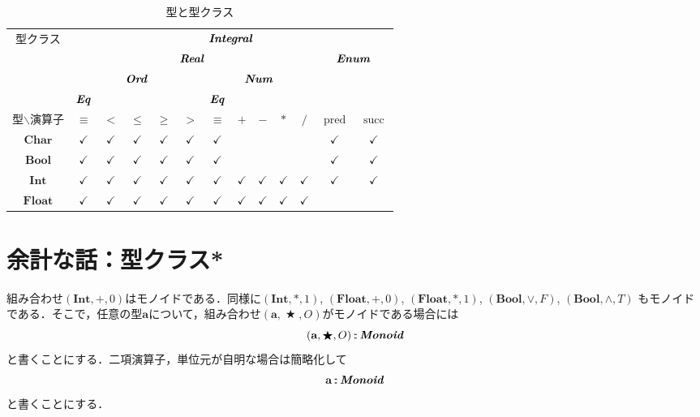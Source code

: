 \documentclass[twocolumn]{jsbook}
\newcommand{\hsklType}[1]{\textbf{#1}}
\newcommand{\hsklTypeClass}[1]{\textbf{\emph{#1}}}
\DeclareMathOperator{\hsklPred}{pred}
\DeclareMathOperator{\hsklSucc}{succ}
\newcommand{\hsklBool}{\hsklType{Bool}}
\newcommand{\hsklChar}{\hsklType{Char}}
\newcommand{\hsklEnum}{\hsklTypeClass{Enum}}
\newcommand{\hsklInt}{\hsklType{Int}}
\newcommand{\hsklIntegral}{\hsklTypeClass{Integral}}
\newcommand{\hsklEq}{\hsklTypeClass{Eq}}
\newcommand{\hsklFloat}{\hsklType{Float}}
\newcommand{\hsklMonoid}{\hsklTypeClass{Monoid}}
\newcommand{\hsklNum}{\hsklTypeClass{Num}}
\newcommand{\hsklOrd}{\hsklTypeClass{Ord}}
\newcommand{\hsklReal}{\hsklTypeClass{Real}}
\DeclareMathOperator{\mathAnyBinaryOperator}{\bigstar}
\DeclareMathOperator{\mathIn}{:\!:}
\newcommand{\mathMonoid}[3]{(#1,#2,#3)}
\begin{document}
\begin{table*}
\caption{型と型クラス}
\label{tab:type-and-typeclass}
\begin{center}
\begin{tabular}{||c||c|c|c|c|c|c|c|c|c|c|c|c||}
\hline
\multirow{4}{*}{型クラス}
    &\multicolumn{12}{|c||}{$\hsklIntegral$}\\
\cline{2-13}
\multirow{3}{*}{}
    &\multicolumn{10}{|c|}{$\hsklReal$}
    &\multicolumn{2}{|c||}{$\hsklEnum$}\\
\cline{2-11}
\multirow{2}{*}{}
    &\multicolumn{5}{|c|}{$\hsklOrd$}
    &\multicolumn{5}{|c|}{$\hsklNum$}
    &\multicolumn{2}{|c||}{ }\\
\cline{2-2}\cline{7-7}
{ }
    &$\hsklEq$
    &\multicolumn{4}{|c|}{ }
    &$\hsklEq$
    &\multicolumn{4}{|c|}{ }
    &\multicolumn{2}{|c||}{ }\\
\hline\hline
型$\backslash$演算子
    &$\equiv$
    &$<$
    &$\le$
    &$\ge$
    &$>$
    &$\equiv$
    &$+$
    &$-$
    &$*$
    &$/$
    &$\hsklPred$
    &$\hsklSucc$\\
\hline
$\hsklChar$
    &$\checkmark$
    &$\checkmark$
    &$\checkmark$
    &$\checkmark$
    &$\checkmark$
    &$\checkmark$
    &
    &
    &
    &
    &$\checkmark$
    &$\checkmark$\\
\hline
$\hsklBool$
    &$\checkmark$
    &$\checkmark$
    &$\checkmark$
    &$\checkmark$
    &$\checkmark$
    &$\checkmark$
    &
    &
    &
    &
    &$\checkmark$
    &$\checkmark$\\
\hline
$\hsklInt$
    &$\checkmark$
    &$\checkmark$
    &$\checkmark$
    &$\checkmark$
    &$\checkmark$
    &$\checkmark$
    &$\checkmark$
    &$\checkmark$
    &$\checkmark$
    &$\checkmark$
    &$\checkmark$
    &$\checkmark$\\
\hline
$\hsklFloat$
    &$\checkmark$
    &$\checkmark$
    &$\checkmark$
    &$\checkmark$
    &$\checkmark$
    &$\checkmark$
    &$\checkmark$
    &$\checkmark$
    &$\checkmark$
    &$\checkmark$
    &
    &\\
\hline
\end{tabular}
\end{center}
\end{table*}

\section{余計な話：型クラス*}

組み合わせ$\mathMonoid{\hsklInt}{+}{0}$はモノイドである．同様に$\mathMonoid{\hsklInt}{*}{1}$, $\mathMonoid{\hsklFloat}{+}{0}$, $\mathMonoid{\hsklFloat}{*}{1}$, $\mathMonoid{\hsklBool}{\vee}{F}$, $\mathMonoid{\hsklBool}{\wedge}{T}$ もモノイドである．そこで，任意の型$\hsklType{a}$について，組み合わせ$\mathMonoid{\hsklType{a}}{\mathAnyBinaryOperator}{O}$がモノイドである場合には
\begin{equation*}
\mathMonoid{\hsklType{a}}{\mathAnyBinaryOperator}{O}\mathIn\hsklMonoid
\end{equation*}
と書くことにする．二項演算子，単位元が自明な場合は簡略化して
\begin{equation*}
\hsklType{a}\mathIn\hsklMonoid
\end{equation*}
と書くことにする．
\end{document}
